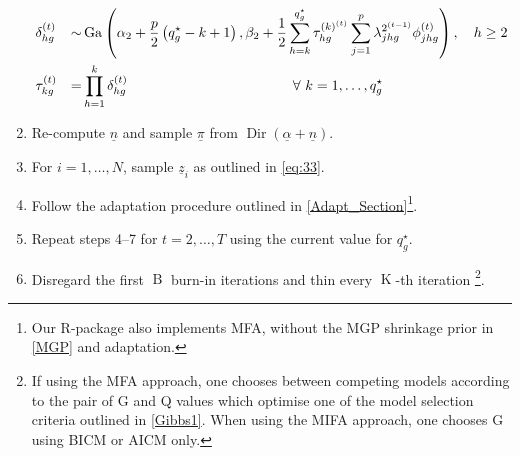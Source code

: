 \documentclass[a4paper,12pt,fleqn]{article}
\numberwithin{equation}{section}
\begin{document}
\begin{enumerate}[label*=\arabic*.]
\begin{alignat*}{4}
		&\delta_{hg}^{\left(t\right)} &\sim& \operatorname{Ga}\left(\alpha_2 + \frac{p}{2}\left(q_g^\star-k+1\right), \beta_2 + \frac{1}{2}\sum_{h=k}^{q_g^\star}\tau_{hg}^{\left(k\right)^{\left(t\right)}}\sum_{j=1}^p\lambda_{jhg}^{2^{\left(t-1\right)}}\phi_{jhg}^{\left(t\right)}\right),\quad h\geq 2\\
		&\tau_{kg}^{\left(t\right)} &=& \prod_{h=1}^{k}\delta_{hg}^{\left(t\right)}\quad\hspace{38mm}\forall~k=1,\ldots,q_g^\star\nonumber
		\end{alignat*}
	\item Re-compute $\underline{n}$ and sample $\underline{\pi}$ from $\operatorname{Dir}\left(\underline{\alpha} + \underline{n}\right)$.
	\item For $i=1,\ldots,N$, sample $\underline{z}_i$ as outlined in \eqref{eq:33}.
	\item Follow the adaptation procedure outlined in \ref{Adapt_Section}\footnote{Our R-package also implements MFA, without the MGP shrinkage prior in \ref{MGP} and adaptation.}.
	\item Repeat steps 4--7 for $t=2,\ldots,T$ using the current value for $q_g^\star$.
	\item Disregard the first $\operatorname{B}$ burn-in iterations and thin every $\operatorname{K}$-th iteration \footnote{If using the MFA approach, one chooses between competing models according to the pair of G and Q values which optimise one of the model selection criteria outlined in \ref{Gibbs1}. When using the MIFA approach, one chooses G using BICM or AICM only.}.
\end{enumerate}
\end{document}
